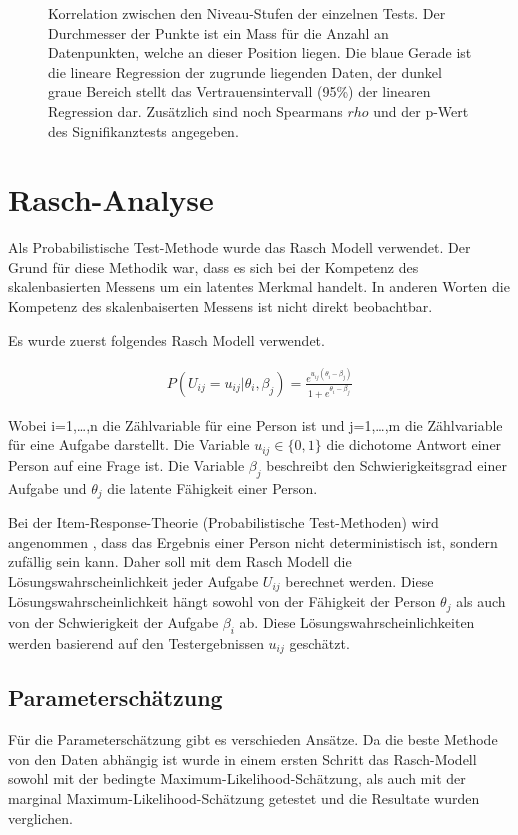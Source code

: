 \begin{figure}[htbp]
\caption{Korrelation zwischen den Niveau-Stufen der einzelnen Tests. Der Durchmesser der Punkte ist ein Mass für die Anzahl an Datenpunkten, welche an dieser Position liegen. Die blaue Gerade ist die lineare Regression der zugrunde liegenden Daten, der dunkel graue Bereich stellt das Vertrauensintervall (95\%) der linearen Regression dar. Zusätzlich sind noch Spearmans $rho$ und der p-Wert des Signifikanztests angegeben.}
\label{fig:corLev}
\end{figure}


\clearpage
\section{Rasch-Analyse}

Als Probabilistische Test-Methode wurde das Rasch Modell verwendet. Der Grund für diese Methodik war, dass es sich bei der Kompetenz des skalenbasierten Messens um ein latentes Merkmal handelt. In anderen Worten die Kompetenz des skalenbaiserten Messens ist nicht direkt beobachtbar.

Es wurde zuerst folgendes Rasch Modell verwendet.

\begin{eqnarray}
P(U_{ij}=u_{ij}|\theta_i,\beta_j) = \frac{e^{u_{ij}(\theta_i-\beta_j)}}{1+e^{\theta_i-\beta_j}}
\end{eqnarray}

Wobei i=1,…,n die Zählvariable für eine Person ist und j=1,…,m die Zählvariable für eine Aufgabe darstellt. Die Variable $u_{ij} \in \{0,1\}$ die dichotome Antwort einer Person auf eine Frage ist. Die Variable $\beta_j$ beschreibt den Schwierigkeitsgrad einer Aufgabe und $\theta_j$ die latente Fähigkeit einer Person.

Bei der Item-Response-Theorie (Probabilistische Test-Methoden) wird angenommen , dass das Ergebnis einer Person nicht deterministisch ist, sondern zufällig sein kann. Daher soll mit dem Rasch Modell die Lösungswahrscheinlichkeit jeder Aufgabe $U_{ij}$ berechnet werden. Diese Lösungswahrscheinlichkeit hängt sowohl von der Fähigkeit der Person $\theta_j$ als auch von der Schwierigkeit der Aufgabe $\beta_i$ ab. Diese Lösungswahrscheinlichkeiten werden basierend auf den Testergebnissen $u_{ij}$ geschätzt.

\subsection{Parameterschätzung}
Für die Parameterschätzung gibt es verschieden Ansätze. Da die beste Methode von den Daten abhängig ist wurde in einem ersten Schritt das Rasch-Modell sowohl mit der bedingte Maximum-Likelihood-Schätzung, als auch mit der marginal Maximum-Likelihood-Schätzung getestet und die Resultate wurden verglichen. 

